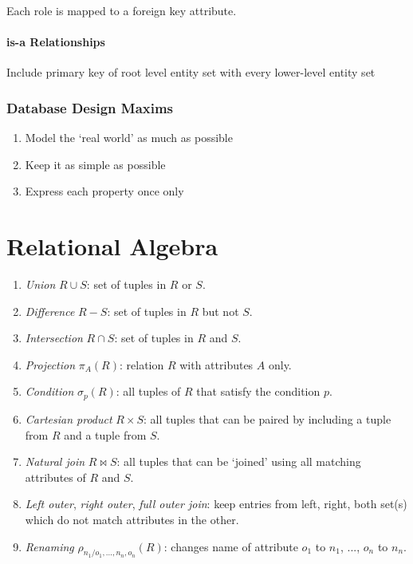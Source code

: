 \documentclass[twocolumn,english]{article}
\begin{document}
Each role is mapped to a foreign key attribute.


\paragraph{is-a Relationships}

Include primary key of root level entity set with every lower-level
entity set


\subsubsection{Database Design Maxims}
\begin{enumerate}
\item Model the `real world' as much as possible
\item Keep it as simple as possible
\item Express each property once only
\end{enumerate}

\section{Relational Algebra}
\begin{enumerate}
\item \emph{Union} $R\cup S$: set of tuples in $R$ or $S$.
\item \emph{Difference} $R-S$: set of tuples in $R$ but not $S$.
\item \emph{Intersection} $R\cap S$: set of tuples in $R$ and $S$.
\item \emph{Projection} $\pi_{A}(R)$: relation $R$ with attributes $A$
only.
\item \emph{Condition} $\sigma_{p}(R)$: all tuples of $R$ that satisfy
the condition $p$.
\item \emph{Cartesian product} $R\times S$: all tuples that can be paired
by including a tuple from $R$ and a tuple from $S$.
\item \emph{Natural join} $R\bowtie S$: all tuples that can be `joined'
using all matching attributes of $R$ and $S$.
\item \emph{Left outer}, \emph{right outer}, \emph{full outer join}: keep
entries from left, right, both set(s) which do not match attributes
in the other.
\item \emph{Renaming} $\rho_{n_{1}/o_{1},\dots,n_{n},o_{n}}(R)$: changes
name of attribute $o_{1}$ to $n_{1}$, ..., $o_{n}$ to $n_{n}$.
\end{enumerate}
\end{document}
